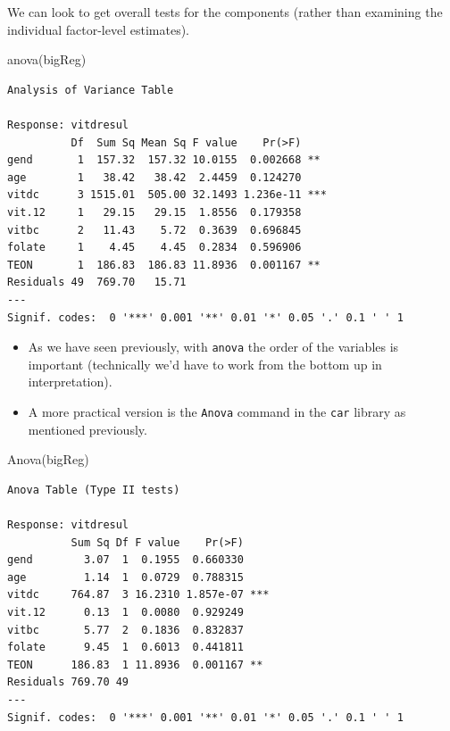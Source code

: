 \documentclass[
  oneside]{krantz}
\newenvironment{Shaded}{\begin{snugshade}}{\end{snugshade}}
\newcommand{\FunctionTok}[1]{\textcolor[rgb]{0.00,0.00,0.00}{#1}}
\newcommand{\NormalTok}[1]{#1}
\providecommand{\tightlist}{%
  \setlength{\itemsep}{0pt}\setlength{\parskip}{0pt}}
\begin{document}
We can look to get overall tests for the components (rather than examining the individual factor-level estimates).

\begin{Shaded}
\begin{Highlighting}[]
\FunctionTok{anova}\NormalTok{(bigReg)}
\end{Highlighting}
\end{Shaded}

\begin{verbatim}
Analysis of Variance Table

Response: vitdresul
          Df  Sum Sq Mean Sq F value    Pr(>F)    
gend       1  157.32  157.32 10.0155  0.002668 ** 
age        1   38.42   38.42  2.4459  0.124270    
vitdc      3 1515.01  505.00 32.1493 1.236e-11 ***
vit.12     1   29.15   29.15  1.8556  0.179358    
vitbc      2   11.43    5.72  0.3639  0.696845    
folate     1    4.45    4.45  0.2834  0.596906    
TEON       1  186.83  186.83 11.8936  0.001167 ** 
Residuals 49  769.70   15.71                      
---
Signif. codes:  0 '***' 0.001 '**' 0.01 '*' 0.05 '.' 0.1 ' ' 1
\end{verbatim}

\begin{itemize}
\tightlist
\item
  As we have seen previously, with \texttt{anova} the order of the variables is important (technically we'd have to work from the bottom up in interpretation).
\item
  A more practical version is the \texttt{Anova} command in the \texttt{car} library as mentioned previously.
\end{itemize}

\begin{Shaded}
\begin{Highlighting}[]
\FunctionTok{Anova}\NormalTok{(bigReg)}
\end{Highlighting}
\end{Shaded}

\begin{verbatim}
Anova Table (Type II tests)

Response: vitdresul
          Sum Sq Df F value    Pr(>F)    
gend        3.07  1  0.1955  0.660330    
age         1.14  1  0.0729  0.788315    
vitdc     764.87  3 16.2310 1.857e-07 ***
vit.12      0.13  1  0.0080  0.929249    
vitbc       5.77  2  0.1836  0.832837    
folate      9.45  1  0.6013  0.441811    
TEON      186.83  1 11.8936  0.001167 ** 
Residuals 769.70 49                      
---
Signif. codes:  0 '***' 0.001 '**' 0.01 '*' 0.05 '.' 0.1 ' ' 1
\end{verbatim}
\end{document}
